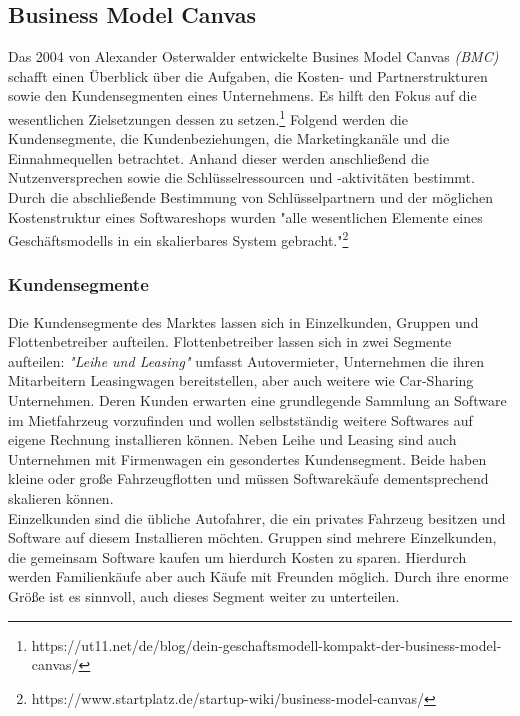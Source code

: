 
\subsection{Business Model Canvas} \label{bmc}
Das 2004 von Alexander Osterwalder entwickelte Busines Model Canvas \textit{(BMC)} schafft einen Überblick über die Aufgaben, die Kosten- und Partnerstrukturen sowie den Kundensegmenten eines Unternehmens. Es hilft den Fokus auf die wesentlichen Zielsetzungen dessen zu setzen.\footnote{https://ut11.net/de/blog/dein-geschaftsmodell-kompakt-der-business-model-canvas/} Folgend werden die Kundensegmente, die Kundenbeziehungen, die Marketingkanäle und die Einnahmequellen betrachtet. Anhand dieser werden anschließend die Nutzenversprechen sowie die Schlüsselressourcen und -aktivitäten bestimmt. Durch die abschließende Bestimmung von Schlüsselpartnern und der möglichen Kostenstruktur eines Softwareshops wurden "alle wesentlichen Elemente eines Geschäftsmodells in ein skalierbares System gebracht."\footnote{https://www.startplatz.de/startup-wiki/business-model-canvas/}

\subsubsection{Kundensegmente}
Die Kundensegmente des Marktes lassen sich in Einzelkunden, Gruppen und Flottenbetreiber aufteilen. Flottenbetreiber lassen sich in zwei Segmente aufteilen: \textit{"Leihe und Leasing"} umfasst Autovermieter, Unternehmen die ihren Mitarbeitern Leasingwagen bereitstellen, aber auch weitere wie Car-Sharing Unternehmen. Deren Kunden erwarten eine grundlegende Sammlung an Software im Mietfahrzeug vorzufinden und wollen selbstständig weitere Softwares auf eigene Rechnung installieren können. Neben Leihe und Leasing sind auch Unternehmen mit Firmenwagen ein gesondertes Kundensegment. Beide haben kleine oder große Fahrzeugflotten und müssen Softwarekäufe dementsprechend skalieren können. \\
Einzelkunden sind die übliche Autofahrer, die ein privates Fahrzeug besitzen und Software auf diesem Installieren möchten. Gruppen sind mehrere Einzelkunden, die gemeinsam Software kaufen um hierdurch Kosten zu sparen. Hierdurch werden Familienkäufe aber auch Käufe mit Freunden möglich. Durch ihre enorme Größe ist es sinnvoll, auch dieses Segment weiter zu unterteilen.

